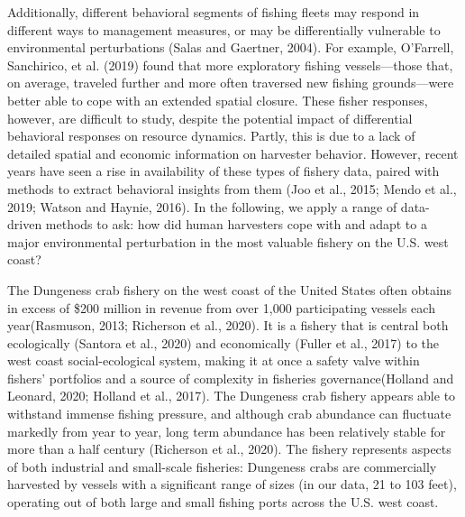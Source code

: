 \documentclass[]{elsarticle} %
\begin{document}
Additionally, different behavioral segments of fishing fleets may
respond in different ways to management measures, or may be
differentially vulnerable to environmental perturbations (Salas and
Gaertner, 2004). For example, O'Farrell, Sanchirico, et al. (2019) found
that more exploratory fishing vessels---those that, on average, traveled
further and more often traversed new fishing grounds---were better able
to cope with an extended spatial closure. These fisher responses,
however, are difficult to study, despite the potential impact of
differential behavioral responses on resource dynamics. Partly, this is
due to a lack of detailed spatial and economic information on harvester
behavior. However, recent years have seen a rise in availability of
these types of fishery data, paired with methods to extract behavioral
insights from them (Joo et al., 2015; Mendo et al., 2019; Watson and
Haynie, 2016). In the following, we apply a range of data-driven methods
to ask: how did human harvesters cope with and adapt to a major
environmental perturbation in the most valuable fishery on the U.S. west
coast?

The Dungeness crab fishery on the west coast of the United States often
obtains in excess of \$200 million in revenue from over 1,000
participating vessels each year(Rasmuson, 2013; Richerson et al., 2020).
It is a fishery that is central both ecologically (Santora et al., 2020)
and economically (Fuller et al., 2017) to the west coast
social-ecological system, making it at once a safety valve within
fishers' portfolios and a source of complexity in fisheries
governance(Holland and Leonard, 2020; Holland et al., 2017). The
Dungeness crab fishery appears able to withstand immense fishing
pressure, and although crab abundance can fluctuate markedly from year
to year, long term abundance has been relatively stable for more than a
half century (Richerson et al., 2020). The fishery represents aspects of
both industrial and small-scale fisheries: Dungeness crabs are
commercially harvested by vessels with a significant range of sizes (in
our data, 21 to 103 feet), operating out of both large and small fishing
ports across the U.S. west coast.
\end{document}
